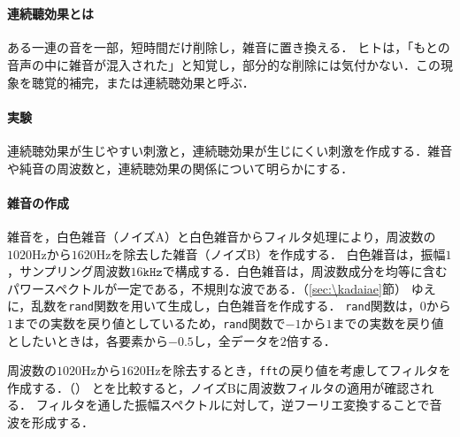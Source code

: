 \section{\kadaidb}\label{sec:\kadaidb}
\purpose
\paragraph{連続聽効果とは}
ある一連の音を一部，短時間だけ削除し，雑音に置き換える．
ヒトは，「もとの音声の中に雑音が混入された」と知覚し，部分的な削除には気付かない．この現象を聴覚的補完，または連続聴効果と呼ぶ．\cite[p.182\ -\ p.183]{感覚知覚心理学}
\paragraph{実験}
連続聴効果が生じやすい刺激と，連続聴効果が生じにくい刺激を作成する．雑音や純音の周波数と，連続聴効果の関係について明らかにする．
\method
\paragraph{雑音の作成}
雑音を，白色雑音（ノイズA）と白色雑音からフィルタ処理により，周波数の\(1020\textrm{Hz}\)から\(1620\textrm{Hz}\)を除去した雑音（ノイズB）を作成する．
白色雑音は，振幅\(1\)，サンプリング周波数\(16\texttt{kHz}\)で構成する．白色雑音は，周波数成分を均等に含むパワースペクトルが一定である，不規則な波である．（\ref{sec:\kadaiae}節）
ゆえに，乱数を\texttt{rand}関数を用いて生成し，白色雑音を作成する．
\texttt{rand}関数は，\(0\)から\(1\)までの実数を戻り値としているため，\texttt{rand}関数で\(-1\)から\(1\)までの実数を戻り値としたいときは，各要素から\(-0.5\)し，全データを\(2\)倍する．\par
周波数の\(1020\textrm{Hz}\)から\(1620\textrm{Hz}\)を除去するとき，\texttt{fft}の戻り値を考慮してフィルタを作成する．（）
とを比較すると，ノイズBに周波数フィルタの適用が確認される．
フィルタを通した振幅スペクトルに対して，逆フーリエ変換することで音波を形成する．\par
